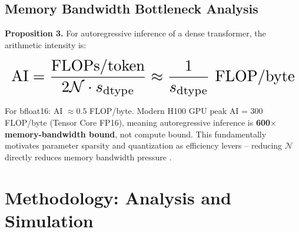 \documentclass[10pt,twocolumn,letterpaper]{article}
\begin{document}
\subsection{Memory Bandwidth Bottleneck Analysis}


\textbf{Proposition 3.} For autoregressive inference of a dense transformer, the arithmetic intensity is:

























\begin{equation}
\resizebox{\columnwidth}{!}{$\displaystyle
\begin{aligned}
\text{AI} = \frac{\text{FLOPs/token}}{2\mathcal{N} \cdot s_{\text{dtype}}} \approx \frac{1}{s_{\text{dtype}}} \text{ FLOP/byte}
\end{aligned}
$}
\end{equation}

























For bfloat16: AI $\approx 0.5$ FLOP/byte. Modern H100 GPU peak AI = 300 FLOP/byte (Tensor Core FP16), meaning autoregressive inference is \textbf{600$\times$ memory-bandwidth bound}, not compute bound. This fundamentally motivates parameter sparsity and quantization as efficiency levers -- reducing $\mathcal{N}$ directly reduces memory bandwidth pressure \cite{arxiv_2406_00584}.




\section{Methodology: Analysis and Simulation}
\end{document}
